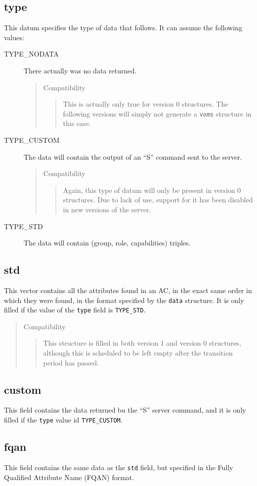 \documentclass[a4paper]{book}
\newenvironment{compatibility}{\begin{quote}\color{red}Compatibility\begin{quote}}{\end{quote}\color{black}\end{quote}}
\begin{document}
\subsection{type}
This datum specifies the type of data that follows.  It can assume the
following values:
\begin{description}
\item [TYPE\_NODATA] There actually was no data returned.
\begin{compatibility}
This is actually only true for version 0 structures. The following
versions will simply not generate a \verb|voms| structure in this
case.
\end{compatibility}
\item [TYPE\_CUSTOM] The data will contain the output of an ``S''
  command sent to the server.
\begin{compatibility}
Again, this type of datum will only be present in version 0
structures.  Due to lack of use, support for it has been disabled in
new versions of the server.
\end{compatibility}
\item [TYPE\_STD] The data will contain (group, role, capabilities)
  triples.
\end{description}

\subsection{std}
This vector contains all the attributes found in an AC, in the exact
same order in which they were found, in the format specified by the
\verb|data| structure.  It is only filled if the value of the
\verb|type| field is \verb|TYPE_STD|.
\begin{compatibility}
This structure is filled in both version 1 and version 0 structures,
although this is scheduled to be left empty after the transition
period has passed.
\end{compatibility}

\subsection{custom}
This field contains the data returned bu the ``S'' server command, and
it is only filled if the \verb|type| value id \verb|TYPE_CUSTOM|.

\subsection{fqan}
This field contains the same data as the \verb|std| field, but
specified in the Fully Qualified Attribute Name (FQAN) format.
\end{document}
